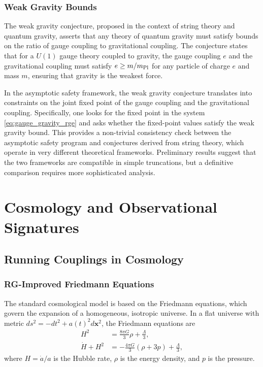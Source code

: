 \documentclass[11pt, twoside, openright]{book}
\theoremstyle{dotted}
\theoremstyle{definition}
\begin{document}
\section{Weak Gravity Bounds}

The weak gravity conjecture, proposed in the context of string theory and quantum
gravity, asserts that any theory of quantum gravity must satisfy bounds on the
ratio of gauge coupling to gravitational coupling. The conjecture states that for
a $U(1)$ gauge theory coupled to gravity, the gauge coupling $e$ and the gravitational
coupling must satisfy $e \geq m/m_{\rm Pl}$ for any particle of charge $e$ and
mass $m$, ensuring that gravity is the weakest force.

In the asymptotic safety framework, the weak gravity conjecture translates into
constraints on the joint fixed point of the gauge coupling and the gravitational
coupling. Specifically, one looks for the fixed point in the system
\eqref{eq:gauge_gravity_rge} and asks whether the fixed-point values satisfy the
weak gravity bound. This provides a non-trivial consistency check between the
asymptotic safety program and conjectures derived from string theory, which operate
in very different theoretical frameworks. Preliminary results suggest that the two
frameworks are compatible in simple truncations, but a definitive comparison
requires more sophisticated analysis.

\part{Cosmology and Observational Signatures}

\chapter{Running Couplings in Cosmology}
\label{ch:rg_cosmology}

\section{RG-Improved Friedmann Equations}

The standard cosmological model is based on the Friedmann equations, which govern
the expansion of a homogeneous, isotropic universe. In a flat universe with
metric $ds^2 = -dt^2 + a(t)^2 d\mathbf{x}^2$, the Friedmann equations are
\begin{align}
  H^2 &= \frac{8\pi G}{3}\rho + \frac{\Lambda}{3},
  \label{eq:friedmann1} \\
  \dot H + H^2 &= -\frac{4\pi G}{3}(\rho + 3p) + \frac{\Lambda}{3},
  \label{eq:friedmann2}
\end{align}
where $H = \dot a/a$ is the Hubble rate, $\rho$ is the energy density, and $p$ is
the pressure.
\end{document}
